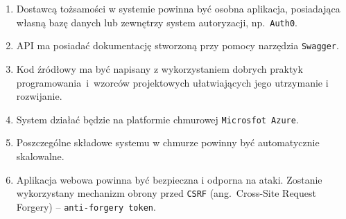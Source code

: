 \begin{enumerate}[labelwidth=1em,label=\arabic*.]
\item Dostawcą tożsamości w systemie powinna być osobna aplikacja, posiadająca własną bazę danych lub zewnętrzy system autoryzacji, np.~\texttt{Auth0}.

\item API ma posiadać dokumentację stworzoną przy pomocy narzędzia \texttt{Swagger}.

\item Kod źródłowy ma być napisany z wykorzystaniem dobrych praktyk programowania~i~wzorców projektowych ułatwiających jego utrzymanie i rozwijanie.

\item System działać będzie na platformie chmurowej \texttt{Microsfot Azure}.

\item Poszczególne składowe systemu w chmurze powinny być automatycznie skalowalne.

\item Aplikacja webowa powinna być bezpieczna i odporna na ataki. Zostanie wykorzystany mechanizm obrony przed \texttt{CSRF} (ang.~Cross-Site Request Forgery) -- \texttt{anti-forgery token}.

\end{enumerate}

